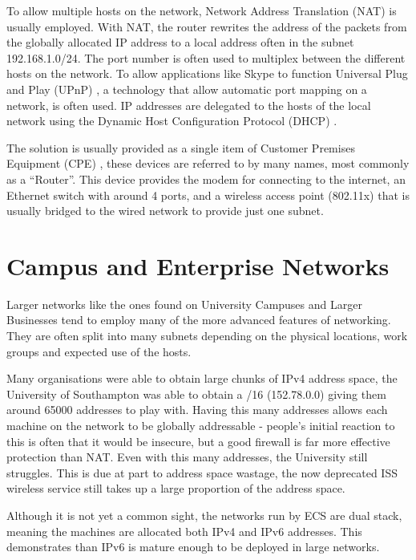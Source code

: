 \documentclass[12pt]{report}
\begin{document}
To allow multiple hosts on the network, Network Address Translation (NAT)
 is usually employed. With
NAT, the router rewrites the address of the packets from the globally
allocated IP address to a local address often in the subnet 192.168.1.0/24.
The port number is often used to multiplex between the different hosts on the
network. To allow applications like Skype to function Universal Plug and Play
(UPnP) , a technology that allow
automatic port mapping on a network, is often used. IP addresses are
delegated to the hosts of the local network using the Dynamic Host
Configuration Protocol (DHCP) . 

The solution is usually provided as a single item of Customer Premises
Equipment (CPE) , these devices
are referred to by many names, most commonly as a ``Router''.  This device
provides the modem for connecting to the internet, an Ethernet switch with
around 4 ports, and a wireless access point (802.11x) that is usually bridged
to the wired network to provide just one subnet. 

\section{Campus and Enterprise Networks}
Larger networks like the ones found on University Campuses and Larger
Businesses tend to employ many of the more advanced features of networking.
They are often split into many subnets depending on the physical locations,
work groups and expected use of the hosts. 

Many organisations were able to obtain large chunks of IPv4 address space, the
University of Southampton was able to obtain a /16 (152.78.0.0) giving them
around 65000 addresses to play with. Having this many addresses allows each
machine on the network to be globally addressable - people's initial reaction
to this is often that it would be insecure, but a good firewall is far more
effective protection than NAT\@. Even with this many addresses, the University
still struggles. This is due at part to address space wastage, the now
deprecated ISS wireless service still takes up a large proportion of the
address space.

Although it is not yet a common sight, the networks run by ECS are dual stack,
meaning the machines are allocated both IPv4 and IPv6 addresses. This
demonstrates than IPv6 is mature enough to be deployed in large networks.
\end{document}
